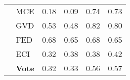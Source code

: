 \begin{tabularx}{\linewidth}{*{6}{X}}
 & MCE & {\cellcolor[HTML]{CDE0F1}} \color[HTML]{000000} 0.18 & {\cellcolor[HTML]{E8F3E8}} \color[HTML]{000000} 0.09  & {\cellcolor[HTML]{084C95}} \color[HTML]{F1F1F1} 0.74 & {\cellcolor[HTML]{46A346}} \color[HTML]{F1F1F1} 0.73 \\
 & GVD & {\cellcolor[HTML]{3D8DC4}} \color[HTML]{F1F1F1} 0.53 & {\cellcolor[HTML]{86C386}} \color[HTML]{000000} 0.48  & {\cellcolor[HTML]{08306B}} \color[HTML]{F1F1F1} 0.82 & {\cellcolor[HTML]{329932}} \color[HTML]{F1F1F1} 0.80 \\
 & FED & {\cellcolor[HTML]{125EA6}} \color[HTML]{F1F1F1} 0.68 & {\cellcolor[HTML]{59AC59}} \color[HTML]{F1F1F1} 0.65  & {\cellcolor[HTML]{125EA6}} \color[HTML]{F1F1F1} 0.68 & {\cellcolor[HTML]{59AC59}} \color[HTML]{F1F1F1} 0.65 \\
 & ECI & {\cellcolor[HTML]{97C6DF}} \color[HTML]{000000} 0.32 & {\cellcolor[HTML]{9FCF9F}} \color[HTML]{000000} 0.38  & {\cellcolor[HTML]{7AB6D9}} \color[HTML]{000000} 0.38 & {\cellcolor[HTML]{93C993}} \color[HTML]{000000} 0.42 \\
 & \textbf{Vote} & {\cellcolor[HTML]{97C6DF}} \color[HTML]{000000} 0.32 & {\cellcolor[HTML]{AAD5AA}} \color[HTML]{000000} 0.33  & {\cellcolor[HTML]{3484BF}} \color[HTML]{F1F1F1} 0.56 & {\cellcolor[HTML]{6EB76E}} \color[HTML]{F1F1F1} 0.57 \\
\bottomrule
\end{tabularx}
